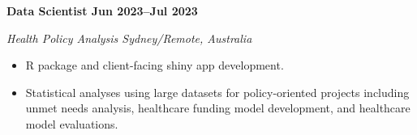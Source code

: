 \textbf{Data Scientist \hfill Jun 2023--Jul 2023}\par
\textit{Health Policy Analysis \hfill Sydney/Remote, Australia}\par
\begin{itemize}
	\item R package and client-facing shiny app development.
	\item Statistical analyses using large datasets for policy-oriented projects including unmet needs analysis, healthcare funding model development, and healthcare model evaluations.
\end{itemize}\par